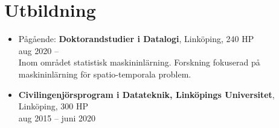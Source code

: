 \documentclass[12pt]{article}
\newcommand{\text}[2]{#2}
\newcommand{\text}[2]{#1}
\begin{document}
\section*{\text{Education}{Utbildning}}
\begin{itemize}
    \item \text{
            In progress: \textbf{Doctoral Studies in Computer Science, Linköping University}, Linköping, 240 ECTS\\
        Aug 2020 --
            \begin{itemize}
                \item Part of the Division of Statistics and Machine Learning, Department of Computer and Information Science. I am supervised by \href{https://lindsten.netlify.app/}{Fredrik Lindsten} (main), \href{https://liu.se/en/employee/persi28}{Per Sidén} and \href{https://www.ida.liu.se/~jospe50/}{Jose M. Peña}
                   \item In my research I develop machine learning methods for data with spatial-, temporal- and graph-structure, including combinations of these. I am interested in how more traditional probabilistic methods in these domains can be combined with deep learning in order to derive new methods with useful properties.
                   \item I am an affiliated PhD Student in the \href{https://wasp-sweden.org/}{Wallenberg AI, Autonomous Systems and Software Program}
            \end{itemize}
        }{
            Pågående: \textbf{Doktorandstudier i Datalogi}, Linköping, 240 HP\\
            aug 2020 -- \\
            Inom området statistisk maskininlärning. Forskning fokuserad på maskininlärning för spatio-temporala problem.
        }
    \item \text{
            \textbf{Master programme in Computer Science and Engineering (Swedish Civilingenjörsprogram), Linköping University}, Linköping, 300 ECTS\\
        Aug 2015 -- June 2020\\
        }{
            \textbf{Civilingenjörsprogram i Datateknik, Linköpings Universitet}, \\ Linköping, 300 HP\\
        aug 2015 -- juni 2020\\
        }

\end{itemize}
\end{document}
